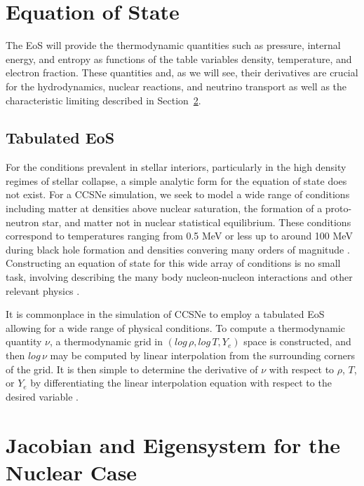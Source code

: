 \documentclass[onecolumn]{aastex62}
\begin{document}
\section{Equation of State}
\label{sec:eos}

The EoS will provide the thermodynamic quantities such as pressure, 
internal energy, and entropy as functions of the table variables density, temperature, and electron 
fraction. These quantities and, as we will see, their derivatives are crucial for the hydrodynamics, nuclear reactions, and 
neutrino transport as well as the characteristic limiting described in Section~\ref{sec:eigen}. 

\subsection{Tabulated EoS}

For the conditions prevalent in stellar interiors, particularly in the high density regimes of stellar collapse, 
a simple analytic form for the equation of state does not exist. For a CCSNe simulation, we seek to model a wide 
range of conditions including matter at densities above nuclear saturation, the formation of a proto-neutron star, 
and matter not in nuclear statistical equilibrium. These conditions correspond to temperatures ranging from 
0.5 MeV or less up to around 100 MeV during black hole formation and densities convering many orders 
of magnitude \citep[see, e.g.,][]{fischer:2011}. Constructing an equation of state for this wide array of conditions is no 
small task, involving describing the many body nucleon-nucleon interactions and other relevant physics 
\citep[for a detailed review, see][]{oertel:2017}.

It is commonplace in the simulation of CCSNe to employ a tabulated EoS allowing for a wide 
range of physical conditions. 
To compute a thermodynamic quantity $\nu$, a thermodynamic grid in $\left( log\, \rho, log\, T, Y_{e} \right)$ space 
is constructed, and then $log\, \nu$ may be computed by linear interpolation from the 
surrounding corners of the grid. It is then simple to determine the derivative of $\nu$ 
with respect to $\rho$, $T$, or $Y_{e}$ by differentiating the linear interpolation 
equation with respect to the desired variable \citep[see e.g.,][for a more detailed description]{mezzacappa:1999, bruenn:2018}.


\section{Jacobian and Eigensystem for the Nuclear Case}
\label{sec:eigen}
\end{document}
